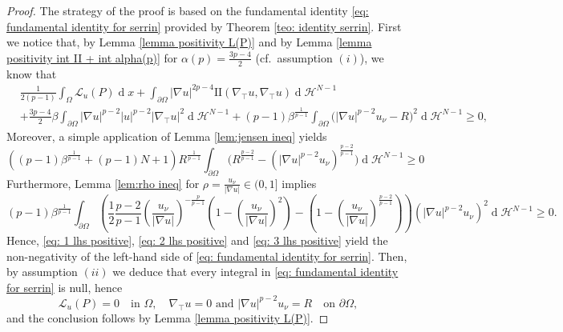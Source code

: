 \documentclass[10pt,a4paper, reqno]{amsart}
\numberwithin{equation}{section}
\renewcommand{\d}[1]{\ensuremath{\operatorname{d}\!{#1}}}
\begin{document}
\begin{proof}
    The strategy of the proof is based on the fundamental identity \eqref{eq: fundamental identity for serrin} provided by Theorem \ref{teo: identity serrin}. First we notice that, by Lemma \ref{lemma positivity L(P)} and by Lemma \ref{lemma positivity int II + int alpha(p)} for $\displaystyle \alpha(p)= \frac{3p-4}{2}$ (cf.\, assumption $(i)$), we know that  
    \begin{equation}\label{eq: 1 lhs positive}
    \begin{aligned}
    &\frac{1}{2(p-1)}\int_\Omega \mathcal{L}_u(P) \d{x} +\int_{\partial\Omega} |\nabla u|^{2p-4} \mathrm{I\!I}(\nabla_\top u,\nabla_\top u) \d{}\mathcal{H}^{N-1} 
    \\
    &+ \frac{3p-4}{2} \beta \int_{\partial\Omega} |\nabla u|^{p-2}|u|^{p-2}|\nabla_\top u|^2 \d{}\mathcal{H}^{N-1} 
    + (p-1) \beta^{\frac{1}{p-1}} \int_{\partial\Omega} \Big(|\nabla u|^{p-2} u_\nu - R \Big)^2  \d{}\mathcal{H}^{N-1}  \geq 0,
    \end{aligned}
    \end{equation}
    Moreover, a simple application of Lemma \ref{lem:jensen ineq} yields 
    \begin{equation}\label{eq: 2 lhs positive}
        \left( (p-1) \beta^{\frac{1}{p-1}} + (p-1)N + 1 \right) R^{\frac{1}{p-1}}  \int_{\partial\Omega} \Big( R^{\frac{p-2}{p-1}} - (|\nabla u|^{p-2} u_\nu)^{\frac{p-2}{p-1}} \Big)  \d{}\mathcal{H}^{N-1} \geq 0
    \end{equation}
    Furthermore, Lemma \ref{lem:rho ineq} for $\displaystyle \rho = \frac{u_\nu}{|\nabla u|} \in (0,1]$ implies 
    \begin{equation}\label{eq: 3 lhs positive}
        (p-1) \beta^{\frac{1}{p-1}}  \int_{\partial\Omega}  \left( \frac{1}{2} \frac{p-2}{p-1} \left(\frac{u_\nu}{|\nabla u|}\right)^{-\frac{p}{p-1}} \left(1- \left(\frac{u_\nu}{|\nabla u|}\right)^2 \right) - \left(1- \left(\frac{u_\nu}{|\nabla u|}\right)^{\frac{p-2}{p-1}} \right) \right) (|\nabla u|^{p-2} u_\nu)^2 \d{}\mathcal{H}^{N-1} \geq 0.
    \end{equation}
    Hence, \eqref{eq: 1 lhs positive}, \eqref{eq: 2 lhs positive} and \eqref{eq: 3 lhs positive} yield the non-negativity of the left-hand side of \eqref{eq: fundamental identity for serrin}. Then, by assumption $(ii)$ we deduce that every integral in \eqref{eq: fundamental identity for serrin} is null, hence
    \begin{equation*}
        \mathcal{L}_u(P) = 0 \quad\text{in } \Omega, \quad \nabla_\top u = 0 \text{ and } |\nabla u|^{p-2} u_\nu = R  \quad \text{on } \partial\Omega,
    \end{equation*}
    and the conclusion follows by Lemma \ref{lemma positivity L(P)}.
\end{proof}
    
\end{document}
